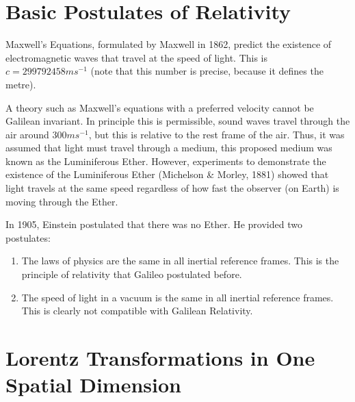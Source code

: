 \documentclass[../Main.tex]{subfiles}
\begin{document}
\section{Basic Postulates of Relativity}
Maxwell's Equations, formulated by Maxwell in 1862, predict the existence of electromagnetic waves that travel at the speed of light. This is $c = 299792458 m s^{-1}$ (note that this number is precise, because it defines the metre).\par
A theory such as Maxwell's equations with a preferred velocity cannot be Galilean invariant. In principle this is permissible, sound waves travel through the air around $300 ms^{-1}$, but this is relative to the rest frame of the air. Thus, it was assumed that light must travel through a medium, this proposed medium was known as the Luminiferous Ether. However, experiments to demonstrate the existence of the Luminiferous Ether (Michelson \& Morley, 1881) showed that light travels at the same speed regardless of how fast the observer (on Earth) is moving through the Ether.\par
In 1905, Einstein postulated that there was no Ether. He provided two postulates:
\begin{enumerate}
    \item The laws of physics are the same in all inertial reference frames. This is the principle of relativity that Galileo postulated before.
    \item The speed of light in a vacuum is the same in all inertial reference frames. This is clearly not compatible with Galilean Relativity.
\end{enumerate}
\section{Lorentz Transformations in One Spatial Dimension}
\end{document}
